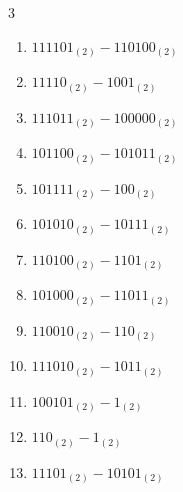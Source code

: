 \begin{multicols}{3}
\begin{enumerate}

  \item $111101_{(2)} - 110100_{(2)}$


  \item $11110_{(2)} - 1001_{(2)}$


  \item $111011_{(2)} - 100000_{(2)}$


  \item $101100_{(2)} - 101011_{(2)}$


\columnbreak %

  \item $101111_{(2)} - 100_{(2)}$


  \item $101010_{(2)} - 10111_{(2)}$


  \item $110100_{(2)} - 1101_{(2)}$


  \item $101000_{(2)} - 11011_{(2)}$


  \item $110010_{(2)} - 110_{(2)}$


  \item $111010_{(2)} - 1011_{(2)}$


  \item $100101_{(2)} - 1_{(2)}$


  \item $110_{(2)} - 1_{(2)}$


  \item $11101_{(2)} - 10101_{(2)}$



\end{enumerate}
\end{multicols}
